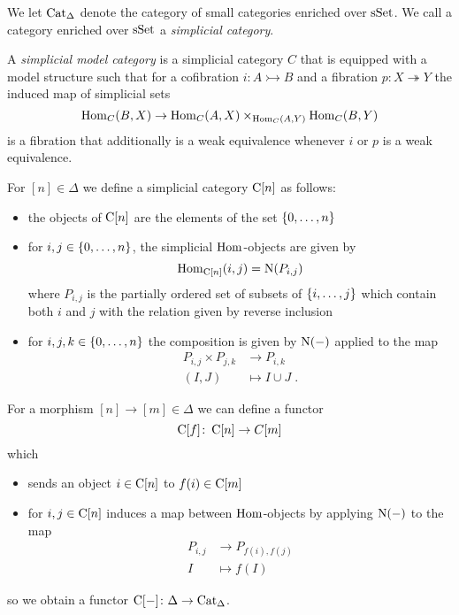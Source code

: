 \begin{definition}
    We let $\operatorname{Cat}_{\Delta}$ denote the category of small categories enriched over $\operatorname{sSet}$.
    We call a category enriched over $\operatorname{sSet}$ a \emph{simplicial category}.
\end{definition}
\begin{definition}
    A \emph{simplicial model category} is a simplicial category $C$ that is equipped with a model structure such that for a cofibration $i:A\rightarrowtail B$ and a fibration $p:X\twoheadrightarrow Y$ the induced map of simplicial sets
    \begin{equation*}
        \operatorname{Hom}_C(B,X)\to\operatorname{Hom}_C(A,X)\times_{\operatorname{Hom}_C(A,Y)}\operatorname{Hom}_C(B,Y)
    \end{equation*}
    is a fibration that additionally is a weak equivalence whenever $i$ or $p$ is a weak equivalence.
\end{definition}
\begin{construction}
    For $[n]\in\Delta$ we define a simplicial category $\operatorname{C}[n]$ as follows:
    \begin{itemize}
        \item the objects of $\operatorname{C}[n]$ are the elements of the set $\left\lbrace0,\ldots,n\right\rbrace$
        \item for $i,j\in\left\lbrace0,\ldots,n\right\rbrace$, the simplicial $\operatorname{Hom}$-objects are given by 
            \begin{equation*}
                \operatorname{Hom}_{\operatorname{C}[n]}(i,j)=\operatorname{N}(P_{i,j})
            \end{equation*}
            where $P_{i,j}$ is the partially ordered set of subsets of $\left\lbrace i,\ldots,j\right\rbrace$ which contain both $i$ and $j$ with the relation given by reverse inclusion
        \item for $i,j,k\in\left\lbrace0,\ldots,n\right\rbrace$ the composition is given by $\operatorname{N}(-)$ applied to the map
        \begin{align*}
                P_{i,j}\times P_{j,k}&\to P_{i,k}\\
                (I,J)&\mapsto I\cup J\;.
        \end{align*}
    \end{itemize}
    For a morphism $[n]\to[m]\in\Delta$ we can define a functor
    \begin{equation*}
        \operatorname{C}[f]\colon\operatorname{C}[n]\to C[m]
    \end{equation*}
    which
    \begin{itemize}
        \item sends an object $i\in\operatorname{C}[n]$ to $f(i)\in\operatorname{C}[m]$
        \item for $i,j\in\operatorname{C}[n]$ induces a map between $\operatorname{Hom}$-objects by applying $\operatorname{N}(-)$ to the map
            \begin{align*}
                P_{i,j}&\to P_{f(i),f(j)}\\
                I&\mapsto f(I)
            \end{align*}
    \end{itemize}
    so we obtain a functor $\operatorname{C}[-]\colon\Delta\to\operatorname{Cat}_{\Delta}$.
\end{construction}
